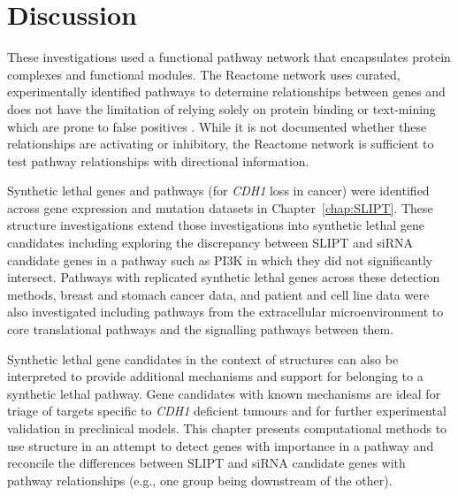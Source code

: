 \FloatBarrier

\section{Discussion}

These investigations used a functional \gls{pathway} network that encapsulates protein complexes and functional modules. The Reactome network uses curated, experimentally identified \glspl{pathway} to determine relationships between genes and does not have the limitation of relying solely on protein binding or text-mining which are prone to false positives \citep{Reactome} . While it is not documented whether these relationships are activating or inhibitory, the Reactome network \citep{Reactome} is sufficient to test \gls{pathway} relationships with directional information.

Synthetic lethal genes and \glspl{pathway} (for \textit{CDH1} loss in cancer) were identified across \gls{gene expression} and \gls{mutation} datasets in Chapter~\ref{chap:SLIPT}.
These  structure investigations extend those investigations into \gls{synthetic lethal} gene candidates including exploring the discrepancy between \gls{SLIPT} and \gls{siRNA} candidate genes in a \gls{pathway} such as \gls{PI3K} in which they did not significantly intersect.
%
Pathways with replicated \gls{synthetic lethal} genes across these detection methods, breast and stomach cancer data, and patient and cell line data were also investigated including \glspl{pathway} from the extracellular microenvironment to core translational \glspl{pathway} and the signalling \glspl{pathway} between them.

Synthetic lethal gene candidates in the context of  structures can also be interpreted to provide additional mechanisms and support for belonging to a \gls{synthetic lethal} \gls{pathway}. Gene candidates with known mechanisms are ideal for triage of targets specific to \textit{CDH1} deficient tumours and for further experimental validation in preclinical models.
This chapter presents computational methods to use  structure in an attempt to detect genes with importance in a \gls{pathway} and reconcile the differences between \gls{SLIPT} and \gls{siRNA} candidate genes with \gls{pathway} relationships (e.g., one group being downstream of the other).

